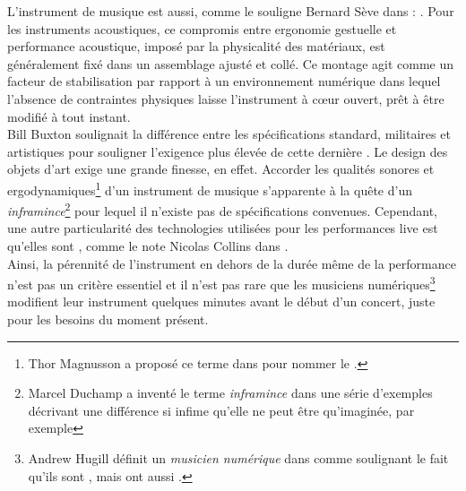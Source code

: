 \noindent L'instrument de musique est aussi, comme le souligne Bernard Sève dans \cite{seve_instrument_2013} : . Pour les instruments acoustiques, ce compromis entre ergonomie gestuelle et performance acoustique, imposé par la physicalité des matériaux, est généralement fixé dans un assemblage ajusté et collé. Ce montage agit comme un facteur de stabilisation par rapport à un environnement numérique dans lequel l'absence de contraintes physiques laisse l'instrument à cœur ouvert, prêt à être modifié à tout instant.\\
\indent Bill Buxton soulignait la différence entre les spécifications standard, militaires et artistiques pour souligner l'exigence plus élevée de cette dernière \cite{buxton_artists_1997}. Le design des objets d'art exige une grande finesse, en effet. Accorder les qualités sonores et ergodynamiques\footnote{Thor Magnusson a proposé ce terme dans \cite{magnusson_ergodynamics_2019} pour nommer le .} d'un instrument de musique s'apparente à la quête d'un \textit{inframince}\footnote{\label{fn:inframince}Marcel Duchamp \cite{duchamp_notes_2008} a inventé le terme \textit{inframince} dans une série d'exemples décrivant une différence si infime qu'elle ne peut être qu'imaginée, par exemple } pour lequel il n'existe pas de spécifications convenues. Cependant, une autre particularité des technologies utilisées pour les performances live est qu'elles sont , comme le note Nicolas Collins dans \cite{collins_semiconducting_2013}.\\
\indent Ainsi, la pérennité de l'instrument en dehors de la durée même de la performance n'est pas un critère essentiel et il n'est pas rare que les musiciens numériques\footnote{Andrew Hugill définit un \textit{musicien numérique} dans \cite{hugill_digital_2008} comme  soulignant le fait qu'ils sont , mais ont aussi .} modifient leur instrument quelques minutes avant le début d'un concert, juste pour les besoins du moment présent.

